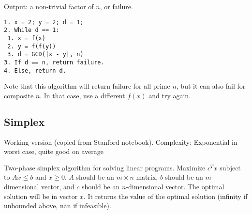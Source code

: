 \documentclass[letterpaper]{article}
\begin{document}
Output: a non-trivial factor of $n$, or failure.

\begin{lstlisting}
1. x = 2; y = 2; d = 1;
2. While d == 1:
 1. x = f(x)
 2. y = f(f(y))
 3. d = GCD(|x - y|, n)
3. If d == n, return failure.
4. Else, return d.
\end{lstlisting}

Note that this algorithm will return failure for all prime $n$, but it can also fail for composite $n$. In that case, use a different $f(x)$ and try again. 

\subsection{Simplex}

Working version (copied from Stanford notebook). Complexity: Exponential in worst case, quite good on average

Two-phase simplex algorithm for solving linear programs. Maximize $c^T x$ subject to $Ax \leq b$ and $x \geq 0$. $A$ should be an $m\times n$ matrix, $b$ should be an $m$-dimensional vector, and $c$ should be an $n$-dimensional vector. The optimal solution will be in vector $x$. It returns the value of the optimal solution (infinity if unbounded above, nan if infeasible).
\end{document}
